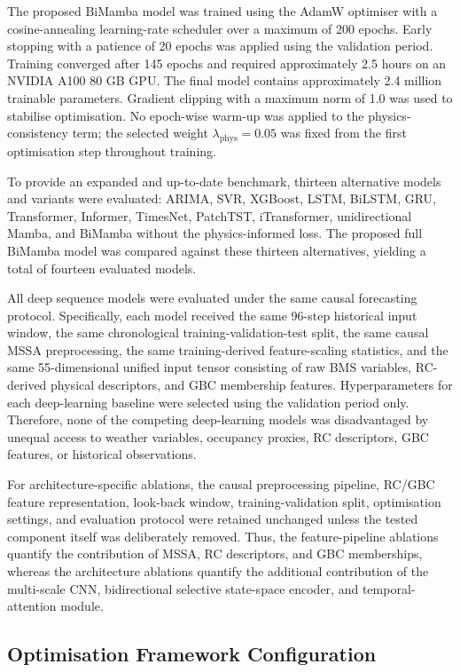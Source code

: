 \documentclass[11pt]{article}
\begin{document}
The proposed BiMamba model was trained using the AdamW optimiser with a cosine-annealing learning-rate scheduler over a maximum of 200 epochs. Early stopping with a patience of 20 epochs was applied using the validation period. Training converged after 145 epochs and required approximately 2.5 hours on an NVIDIA A100 80 GB GPU. The final model contains approximately 2.4 million trainable parameters. Gradient clipping with a maximum norm of 1.0 was used to stabilise optimisation. No epoch-wise warm-up was applied to the physics-consistency term; the selected weight $\lambda_{\mathrm{phys}}=0.05$ was fixed from the first optimisation step throughout training.

To provide an expanded and up-to-date benchmark, thirteen alternative models and variants were evaluated: ARIMA, SVR, XGBoost, LSTM, BiLSTM, GRU, Transformer, Informer, TimesNet, PatchTST, iTransformer, unidirectional Mamba, and BiMamba without the physics-informed loss. The proposed full BiMamba model was compared against these thirteen alternatives, yielding a total of fourteen evaluated models.

All deep sequence models were evaluated under the same causal forecasting protocol. Specifically, each model received the same 96-step historical input window, the same chronological training-validation-test split, the same causal MSSA preprocessing, the same training-derived feature-scaling statistics, and the same 55-dimensional unified input tensor consisting of raw BMS variables, RC-derived physical descriptors, and GBC membership features. Hyperparameters for each deep-learning baseline were selected using the validation period only. Therefore, none of the competing deep-learning models was disadvantaged by unequal access to weather variables, occupancy proxies, RC descriptors, GBC features, or historical observations.

For architecture-specific ablations, the causal preprocessing pipeline, RC/GBC feature representation, look-back window, training-validation split, optimisation settings, and evaluation protocol were retained unchanged unless the tested component itself was deliberately removed. Thus, the feature-pipeline ablations quantify the contribution of MSSA, RC descriptors, and GBC memberships, whereas the architecture ablations quantify the additional contribution of the multi-scale CNN, bidirectional selective state-space encoder, and temporal-attention module.

\subsection{Optimisation Framework Configuration}
\end{document}
